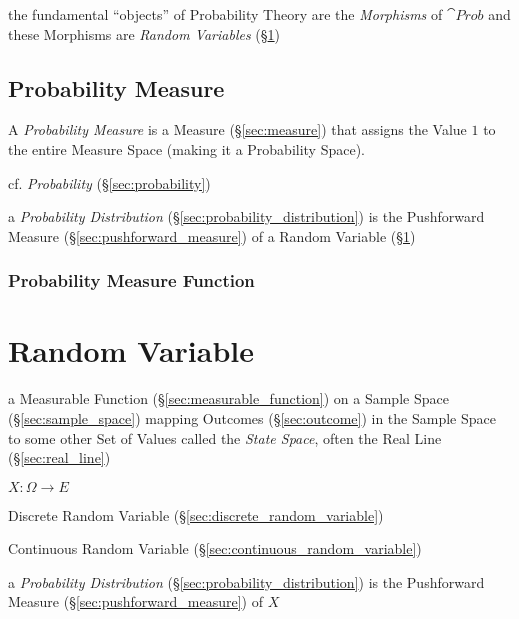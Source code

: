 the fundamental ``objects'' of Probability Theory are the \emph{Morphisms} of
$\cat{Prob}$ and these Morphisms are \emph{Random Variables}
(\S\ref{sec:random_variable})



\subsection{Probability Measure}\label{sec:probability_measure}

A \emph{Probability Measure} is a Measure (\S\ref{sec:measure}) that assigns the
Value $1$ to the entire Measure Space (making it a Probability Space).

cf. \emph{Probability} (\S\ref{sec:probability})

\fist a \emph{Probability Distribution} (\S\ref{sec:probability_distribution})
is the Pushforward Measure (\S\ref{sec:pushforward_measure}) of a Random
Variable (\S\ref{sec:random_variable})



\subsubsection{Probability Measure Function}
\label{sec:probability_measure_function}



\section{Random Variable}\label{sec:random_variable}

a Measurable Function (\S\ref{sec:measurable_function}) on a Sample Space
(\S\ref{sec:sample_space}) mapping Outcomes (\S\ref{sec:outcome}) in the Sample
Space to some other Set of Values called the \emph{State Space}, often the Real
Line (\S\ref{sec:real_line})

$X : \Omega \rightarrow E$

Discrete Random Variable (\S\ref{sec:discrete_random_variable})

Continuous Random Variable (\S\ref{sec:continuous_random_variable})

a \emph{Probability Distribution} (\S\ref{sec:probability_distribution})
is the Pushforward Measure (\S\ref{sec:pushforward_measure}) of $X$

